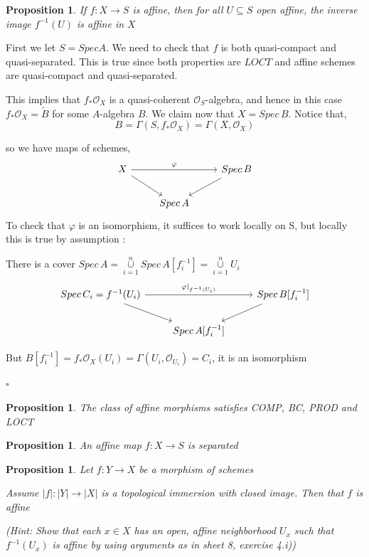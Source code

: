 \documentclass{article}
\newtheorem{proposition}[theorem]{Proposition}
\newenvironment{Proof}{{\noindent \indent \it Proof:\quad}}{\hfill $\square$\par}
\begin{document}
\begin{proposition}
If $f : X \to S$ is affine, then for all $U \subseteq S$ open affine, the inverse image $f^{-1}(U)$
is affine in $X$
\end{proposition}
\begin{Proof}
    First we let $S = Spec A$. We need to check that $f$ is both quasi-compact and quasi-separated.
This is true since both properties are $LOCT$ and affine schemes are quasi-compact and quasi-separated.

This implies that $f_\ast\mathcal O_X$ is a quasi-coherent $\mathcal O_S$-algebra, and hence in this case $f_\ast\mathcal O_X = \widetilde B$ for some
$A$-algebra $B$. We claim now that $X = Spec\, B$. Notice that,
$$
B = \Gamma(S, f_\ast\mathcal O_X) = \Gamma(X, \mathcal O_X)
$$

so we have maps of schemes,
\[\begin{tikzcd}
	X && {Spec\,B} \\
	& {Spec\, A}
	\arrow[from=1-1, to=2-2]
	\arrow[from=1-3, to=2-2]
	\arrow["\varphi", from=1-1, to=1-3]
\end{tikzcd}\]
To check that $\varphi$ is an isomorphism, it suffices to work locally on S, but locally this is true by assumption :

There is a cover $Spec\,A
=\mathop{\cup}\limits_{i=1}^n Spec\,A[f_i^{-1}]
=\mathop{\cup}\limits_{i=1}^n U_i$
\[\begin{tikzcd}
	{Spec\, C_i=f^{-1}(U_i)} && {Spec\,B[f_i^{-1}]} \\
	& {Spec\, A[f_i^{-1}]}
	\arrow[from=1-1, to=2-2]
	\arrow[from=1-3, to=2-2]
	\arrow["{\varphi|_{f^{-1}(U_i)}}", from=1-1, to=1-3]
\end{tikzcd}\]

But $B[f_i^{-1}]=f_\ast\mathcal O_X(U_i)=\Gamma(U_i,\mathcal O_{U_i})=C_i$, it is an isomorphism

\end{Proof}

\begin{proposition}
    The class of affine morphisms satisfies COMP, BC, PROD and LOCT
\end{proposition}

\begin{proposition}
    An affine map $f : X \to S$ is separated
\end{proposition}

\begin{proposition}
    Let $f : Y \to X$ be a morphism of schemes
    
Assume $|f|: |Y | \to |X|$ is a topological immersion with closed image. Then that $f$ is affine

(Hint: Show that each $x \in X$ has an open, affine neighborhood $U_x$ such that $f^{-1}(U_x)$ is affine
by using arguments as in sheet 8, exercise 4.i))
\end{proposition}
\end{document}
